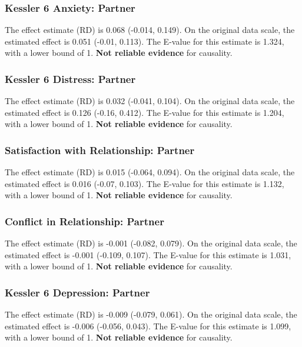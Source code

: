 \documentclass[
  singlecolumn]{article}
\begin{document}
\subsubsection{Kessler 6 Anxiety:
Partner}\label{kessler-6-anxiety-partner-11}

The effect estimate (RD) is 0.068 (-0.014, 0.149). On the original data
scale, the estimated effect is 0.051 (-0.01, 0.113). The E-value for
this estimate is 1.324, with a lower bound of 1. \textbf{Not reliable
evidence} for causality.

\subsubsection{Kessler 6 Distress:
Partner}\label{kessler-6-distress-partner-11}

The effect estimate (RD) is 0.032 (-0.041, 0.104). On the original data
scale, the estimated effect is 0.126 (-0.16, 0.412). The E-value for
this estimate is 1.204, with a lower bound of 1. \textbf{Not reliable
evidence} for causality.

\subsubsection{Satisfaction with Relationship:
Partner}\label{satisfaction-with-relationship-partner-11}

The effect estimate (RD) is 0.015 (-0.064, 0.094). On the original data
scale, the estimated effect is 0.016 (-0.07, 0.103). The E-value for
this estimate is 1.132, with a lower bound of 1. \textbf{Not reliable
evidence} for causality.

\subsubsection{Conflict in Relationship:
Partner}\label{conflict-in-relationship-partner-11}

The effect estimate (RD) is -0.001 (-0.082, 0.079). On the original data
scale, the estimated effect is -0.001 (-0.109, 0.107). The E-value for
this estimate is 1.031, with a lower bound of 1. \textbf{Not reliable
evidence} for causality.

\subsubsection{Kessler 6 Depression:
Partner}\label{kessler-6-depression-partner-11}

The effect estimate (RD) is -0.009 (-0.079, 0.061). On the original data
scale, the estimated effect is -0.006 (-0.056, 0.043). The E-value for
this estimate is 1.099, with a lower bound of 1. \textbf{Not reliable
evidence} for causality.
\end{document}
